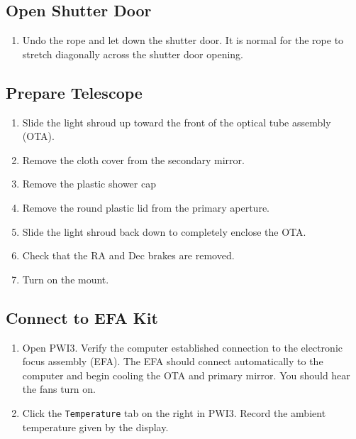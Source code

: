 \documentclass{article}
\begin{document}
		\subsection{Open Shutter Door}
			
			\begin{enumerate}
				
				\item Undo the rope and let down the shutter door. It is normal for the rope to stretch diagonally across the shutter door opening.
				
			\end{enumerate}
		
		\subsection{Prepare Telescope}
		
			\begin{enumerate}
				
				\item Slide the light shroud up toward the front of the optical tube assembly (OTA).
			
				\item Remove the cloth cover from the secondary mirror.
			
				\item Remove the plastic shower cap 
			
				\item Remove the round plastic lid from the primary aperture.
			
				\item Slide the light shroud back down to completely enclose the OTA.
	
				\item Check that the RA and Dec brakes are removed.
			
				\item Turn on the mount.
				
			\end{enumerate}
		
		\subsection{Connect to EFA Kit}
		
			\begin{enumerate}
				
				\item Open PWI3. Verify the computer established connection to the electronic focus assembly (EFA). The EFA should connect automatically to the computer and begin cooling the OTA and primary mirror. You should hear the fans turn on.
				
				\item Click the \texttt{Temperature} tab on the right in PWI3. Record the ambient temperature given by the display.
								
			\end{enumerate}
		
\end{document}
